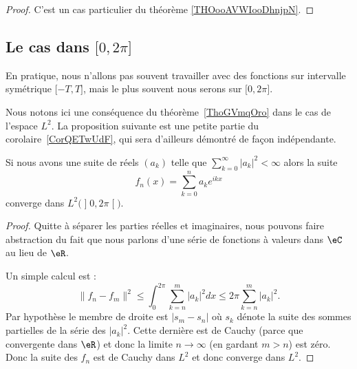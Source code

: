 \begin{proof}
	C'est un cas particulier du théorème \ref{THOooAVWIooDhnjpN}.
\end{proof}




\subsection{Le cas dans \( \mathopen[ 0 , 2\pi \mathclose]\)}

En pratique, nous n'allons pas souvent travailler avec des fonctions sur intervalle symétrique \( \mathopen[ -T , T \mathclose]\), mais le plus souvent nous serons sur \( \mathopen[ 0 , 2\pi \mathclose]\).

Nous notons ici une conséquence du théorème~\ref{ThoGVmqOro} dans le cas de l'espace \( L^2\). La proposition suivante est une petite partie du corolaire~\ref{CorQETwUdF}, qui sera d'ailleurs démontré de façon indépendante.

\begin{proposition}
	Si nous avons une suite de réels \( (a_k)\) telle que \( \sum_{k=0}^{\infty}| a_k |^2<\infty\) alors la suite
	\begin{equation}
		f_n(x)=\sum_{k=0}^na_k e^{ikx}
	\end{equation}
	converge dans \( L^2\big( \mathopen] 0 , 2\pi \mathclose[ \big)\).
\end{proposition}

\begin{proof}
	Quitte à séparer les parties réelles et imaginaires, nous pouvons faire abstraction du fait que nous parlons d'une série de fonctions à valeurs dans \( \eC\) au lieu de \( \eR\).

	Un simple calcul est :
	\begin{equation}    \label{EqHVdJxZT}
		\| f_n-f_m \|^2\leq\int_0^{2\pi}\sum_{k=n}^m| a_k |^2dx\leq 2\pi\sum_{k=n}^m| a_k |^2.
	\end{equation}
	Par hypothèse le membre de droite est \( | s_m-s_n |\) où \( s_k\) dénote la suite des sommes partielles de la série des \( | a_k |^2\). Cette dernière est de Cauchy (parce que convergente dans \( \eR\)) et donc la limite \( n\to\infty\) (en gardant \( m>n\)) est zéro. Donc la suite des \( f_n\) est de Cauchy dans \( L^2\) et donc converge dans \( L^2\).
\end{proof}

